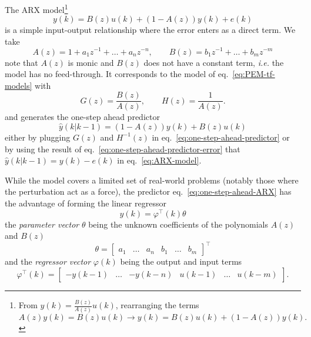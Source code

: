 The ARX model\footnote{From $y(k) = \frac{B(z)}{A(z)}u(k)$, rearranging the terms
  \begin{equation*}
     A(z)y(k) = B(z)u(k) \rightarrow y(k) = B(z)u(k) + (1-A(z))y(k).
  \end{equation*}}
\begin{equation}
  \label{eq:ARX-model}
  y(k) = B(z)u(k) + \left(1-A(z)\right)y(k) + e(k)
\end{equation}
is a simple input-output relationship where the error enters as a direct term. We take
\begin{equation*}
  A(z) = 1 + a_1z^{-1} + \ldots + a_nz^{-n},\hspace{2em} B(z) = b_1z^{-1} + \ldots + b_mz^{-m}
\end{equation*}
note that $A(z)$ is monic and $B(z)$ does not have a constant term, \textit{i.e.} the model has no feed-through. It corresponds to the model of eq.~\eqref{eq:PEM-tf-models} with
\begin{equation*}
  G(z) = \frac{B(z)}{A(z)},\hspace{2em}H(z) = \frac{1}{A(z)}.
\end{equation*}
and generates the one-step ahead predictor
\begin{equation}
  \label{eq:one-step-ahead-ARX}
  \hat{y}(k|k-1) = \left(1-A(z)\right)y(k) + B(z)u(k)
\end{equation}
either by plugging $G(z)$ and $H^{-1}(z)$ in eq.~\eqref{eq:one-step-ahead-predictor} or by using the result of eq.~\eqref{eq:one-step-ahead-predictor-error} that $\hat{y}(k|k-1) = y(k) - e(k)$ in eq.~\eqref{eq:ARX-model}.

While the model covers a limited set of real-world problems (notably those where the perturbation act as a force), the predictor eq.~\eqref{eq:one-step-ahead-ARX} has the advantage of forming the linear regressor
\begin{equation*}
  y(k) = \varphi^\top(k)\theta
\end{equation*}
the \emph{parameter vector} $\theta$ being the unknown coefficients of the polynomials $A(z)$ and $B(z)$
\begin{equation*}
  \theta =
  \begin{bmatrix}
    a_1 & \ldots & a_n & b_1 & \ldots & b_m
  \end{bmatrix}^\top
\end{equation*}
and the \emph{regressor vector} $\varphi(k)$ being the output and input terms
\begin{equation*}
  \varphi^\top(k) =
  \begin{bmatrix}
    -y(k-1) & \ldots & -y(k-n) & u(k-1) & \ldots & u(k-m)
  \end{bmatrix}.
\end{equation*}

